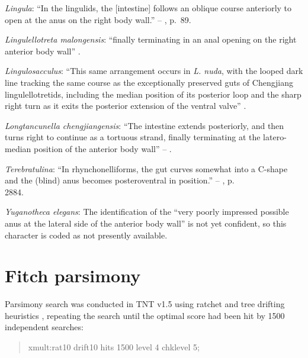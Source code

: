 \documentclass[openany]{book}
\theoremstyle{definition}
\theoremstyle{definition}
\theoremstyle{definition}
\theoremstyle{remark}
\begin{document}
\hypertarget{Lingula-coding-196}{}
\emph{Lingula}: ``In the lingulids, the {[}intestine{]} follows an
oblique course anteriorly to open at the anus on the right body wall.''
-- \citet{Williams1997Introduction}, p.~89.

\hypertarget{Lingulellotreta_malongensis-coding-196}{}
\emph{Lingulellotreta malongensis}: ``finally terminating in an anal
opening on the right anterior body wall'' \citep[p.66]{Zhang2007Noteon}.

\hypertarget{Lingulosacculus-coding-196}{}
\emph{Lingulosacculus}: ``This same arrangement occurs in \emph{L.
nuda}, with the looped dark line tracking the same course as the
exceptionally preserved guts of Chengjiang lingulellotretids, including
the median position of its posterior loop and the sharp right turn as it
exits the posterior extension of the ventral valve''
\citep[p.310]{Balthasar2009EarlyCambrian}.

\hypertarget{Longtancunella_chengjiangensis-coding-196}{}
\emph{Longtancunella chengjiangensis}: ``The intestine extends
posteriorly, and then turns right to continue as a tortuous strand,
finally terminating at the latero-median position of the anterior body
wall'' -- \citet{Zhang2007Agregarious}.

\hypertarget{Terebratulina-coding-196}{}
\emph{Terebratulina}: ``In rhynchonelliforms, the gut curves somewhat
into a C-shape and the (blind) anus becomes posteroventral in
position.'' -- \citet{Williams2007Supplement}, p.\\
2884.

\hypertarget{Yuganotheca_elegans-coding-196}{}
\emph{Yuganotheca elegans}: The identification of the ``very poorly
impressed possible anus at the lateral side of the anterior body wall''
is not yet confident, so this character is coded as not presently
available.

\hypertarget{fitch}{\chapter{Fitch parsimony}\label{fitch}}

Parsimony search was conducted in TNT v1.5 \citep{Goloboff2016} using
ratchet and tree drifting heuristics \citep{Goloboff1999, Nixon1999},
repeating the search until the optimal score had been hit by 1500
independent searches:

\begin{quote}
xmult:rat10 drift10 hits 1500 level 4 chklevel 5;
\end{quote}
\end{document}
